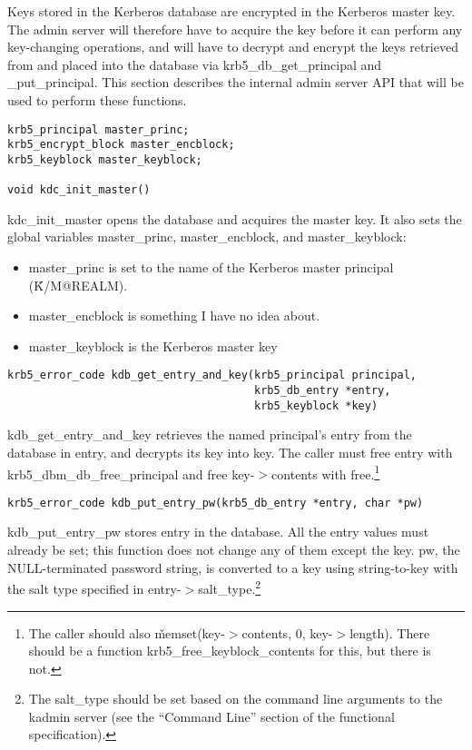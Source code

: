 Keys stored in the Kerberos database are encrypted in the Kerberos
master key.  The admin server will therefore have to acquire the key
before it can perform any key-changing operations, and will have to
decrypt and encrypt the keys retrieved from and placed into the
database via krb5_db_get_principal and _put_principal.  This section
describes the internal admin server API that will be used to perform
these functions.

\begin{verbatim}
krb5_principal master_princ;
krb5_encrypt_block master_encblock;
krb5_keyblock master_keyblock;

void kdc_init_master()
\end{verbatim}

kdc_init_master opens the database and acquires the master key.  It
also sets the global variables master_princ, master_encblock, and
master_keyblock:

\begin{itemize}
\item master_princ is set to the name of the Kerberos master principal
(\v{K/M@REALM}).

\item master_encblock is something I have no idea about.

\item master_keyblock is the Kerberos master key
\end{itemize}

\begin{verbatim}
krb5_error_code kdb_get_entry_and_key(krb5_principal principal,
                                      krb5_db_entry *entry,
                                      krb5_keyblock *key)
\end{verbatim}

kdb_get_entry_and_key retrieves the named principal's entry from the
database in entry, and decrypts its key into key.  The caller must
free entry with krb5_dbm_db_free_principal and free key-$>$contents with
free.\footnote{The caller should also \v{memset(key-$>$contents, 0,
key-$>$length)}.  There should be a function krb5_free_keyblock_contents
for this, but there is not.}

\begin{verbatim}
krb5_error_code kdb_put_entry_pw(krb5_db_entry *entry, char *pw)
\end{verbatim}

kdb_put_entry_pw stores entry in the database.  All the entry values
must already be set; this function does not change any of them except
the key.  pw, the NULL-terminated password string, is converted to a
key using string-to-key with the salt type specified in
entry-$>$salt_type.\footnote{The salt_type should be set based on the
command line arguments to the kadmin server (see the ``Command Line''
section of the functional specification).}


